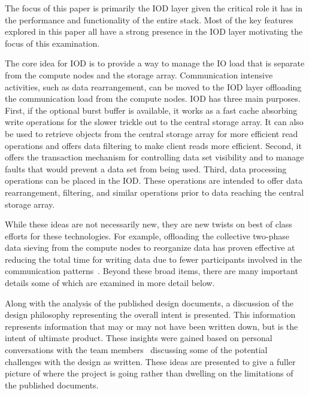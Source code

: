 \documentclass[conference]{IEEEtran}
\begin{document}
The focus of this paper is primarily the IOD layer given the critical role it
has in the performance and functionality of the entire stack. Most of the key
features explored in this paper all have a strong presence in the IOD layer
motivating the focus of this examination.

The core idea for IOD is to provide a way to manage the IO load that is
separate from the compute nodes and the storage array. Communication intensive
activities, such as data rearrangement, can be moved to the IOD layer
offloading the communication load from the compute nodes. IOD has three main
purposes. First, if the optional burst buffer is available, it works as a fast
cache absorbing write operations for the slower trickle out to the central
storage array. It can also be used to retrieve objects from the central storage
array for more efficient read operations and offers data filtering to make
client reads more efficient.  Second, it offers the transaction mechanism for
controlling data set visibility and to manage faults that would prevent a data
set from being used. Third, data processing operations can be placed in the
IOD. These operations are intended to offer data rearrangement, filtering, and
similar operations prior to data reaching the central storage array.

While these ideas are not necessarily new, they are new twists on best of class
efforts for these technologies. For example, offloading the collective
two-phase data sieving from the compute nodes to reorganize data has proven
effective at reducing the total time for writing data due to fewer participants
involved in the communication patterns~\cite{lofstead:2011:nessie-staging}.
Beyond these broad items, there are many important details some of which are
examined in more detail below.

Along with the analysis of the published design documents, a discussion of the
design philosophy representing the overall intent is presented. This
information represents information that may or may not have been written down,
but is the intent of ultimate product. These insights were gained based on
personal conversations with the team
members~\cite{JohnBent,QuinceyKoziol,EricBarton} discussing some of the
potential challenges with the design as written. These ideas are presented to
give a fuller picture of where the project is going rather than dwelling on the
limitations of the published documents.
\end{document}
